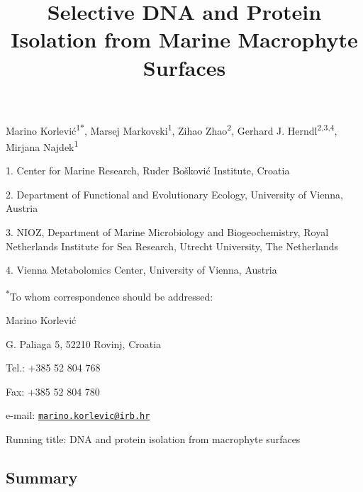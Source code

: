 \documentclass[12pt,]{article}
\title{\textbf{Selective DNA and Protein Isolation from Marine Macrophyte
Surfaces}}
\author{}
\date{}
\begin{document}
\maketitle

\vspace{20mm}

Marino Korlević\textsuperscript{1\(*\)}, Marsej
Markovski\textsuperscript{1}, Zihao Zhao\textsuperscript{2}, Gerhard J.
Herndl\textsuperscript{2,3,4}, Mirjana Najdek\textsuperscript{1}

1. Center for Marine Research, Ruđer Bošković Institute, Croatia

2. Department of Functional and Evolutionary Ecology, University of
Vienna, Austria

3. NIOZ, Department of Marine Microbiology and Biogeochemistry, Royal
Netherlands Institute for Sea Research, Utrecht University, The
Netherlands

4. Vienna Metabolomics Center, University of Vienna, Austria

\textsuperscript{\(*\)}To whom correspondence should be addressed:

Marino Korlević

G. Paliaga 5, 52210 Rovinj, Croatia

Tel.: +385 52 804 768

Fax: +385 52 804 780

e-mail:
\href{mailto:marino.korlevic@irb.hr}{\nolinkurl{marino.korlevic@irb.hr}}

Running title: DNA and protein isolation from macrophyte surfaces

\newpage
\linenumbers
{}
\setlength\parindent{24pt}
\doublespacing

\hypertarget{summary}{%
\subsection{Summary}\label{summary}}
\end{document}
